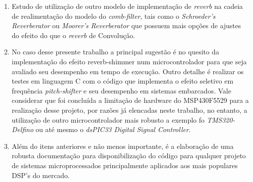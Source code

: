 		 \begin{enumerate}
		 	\item Estudo de utilização de outro modelo de implementação de \textit{reverb} na cadeia de realimentação do modelo do \textit{comb-filter}, tais como o \textit{Schroeder’s Reverberator} ou \textit{Moorer’s Reverberator} \cite{Reiss2014} que possuem mais opções de ajustes do efeito do que o \textit{reverb} de Convolução.
		 	
		 	\item No caso desse presente trabalho a principal sugestão é no quesito da implementação do efeito reverb-shimmer num microcontrolador para que seja avaliado seu desempenho em tempo de execução. Outro detalhe é realizar os testes em linguagem C com o código que implementa o efeito seletivo em frequência \textit{pitch-shifter} e seu desempenho em sistemas embarcados. Vale considerar que foi concluída a limitação de hardware do MSP430F5529 para a realização desse projeto, por razões já elencadas neste trabalho, no entanto, a utilização de outro microcontrolador mais robusto a exemplo fo \textit{TMS320-Delfino} ou até mesmo o \textit{dsPIC33 Digital Signal Controller}.
		 	
		 	\item Além do itens anteriores e não menos importante, é a elaboração de uma robusta documentação para disponibilização do código para qualquer projeto de sistemas microprocessados principalmente aplicados aos mais populares DSP's do mercado.
		 \end{enumerate}
		 
		 
		 
		 
		 
		
		
	
